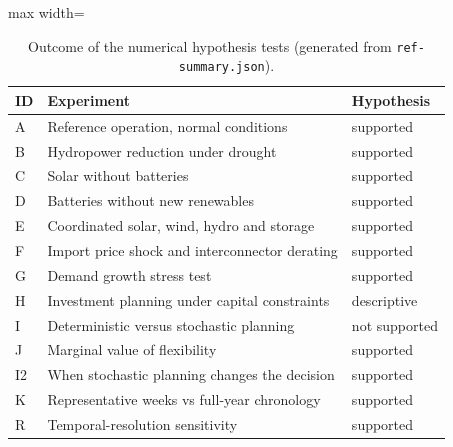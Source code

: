 \begin{table}[htbp]
\centering
\footnotesize
\caption{Outcome of the numerical hypothesis tests (generated from \texttt{ref-summary.json}).}
\label{tab:summary-findings}
\begin{adjustbox}{max width=\linewidth}
\begin{tabular}{lp{9cm}l}
\toprule
ID & Experiment & Hypothesis \\
\midrule
A & Reference operation, normal conditions & supported \\
B & Hydropower reduction under drought & supported \\
C & Solar without batteries & supported \\
D & Batteries without new renewables & supported \\
E & Coordinated solar, wind, hydro and storage & supported \\
F & Import price shock and interconnector derating & supported \\
G & Demand growth stress test & supported \\
H & Investment planning under capital constraints & descriptive \\
I & Deterministic versus stochastic planning & not supported \\
J & Marginal value of flexibility & supported \\
I2 & When stochastic planning changes the decision & supported \\
K & Representative weeks vs full-year chronology & supported \\
R & Temporal-resolution sensitivity & supported \\
\bottomrule
\end{tabular}
\end{adjustbox}
\end{table}
